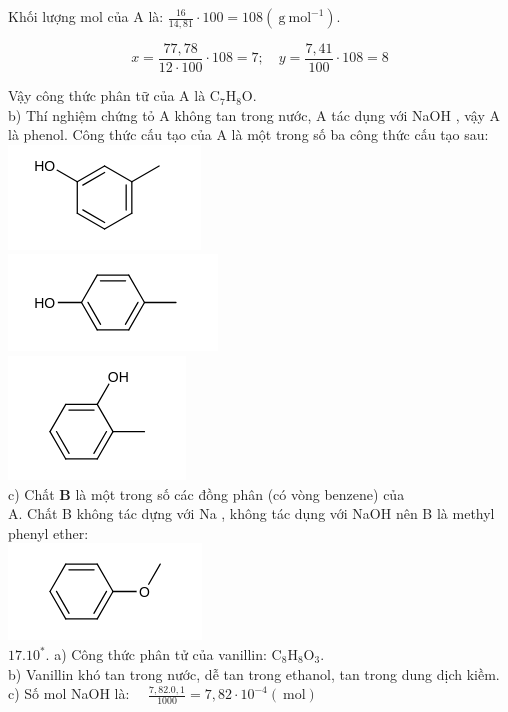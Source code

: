 \documentclass[10pt]{article}
\begin{document}
Khối lượng mol của A là: $\frac{16}{14,81} \cdot 100=108\left(\mathrm{~g} \mathrm{~mol}^{-1}\right)$.

$$
x=\frac{77,78}{12 \cdot 100} \cdot 108=7 ; \quad y=\frac{7,41}{100} \cdot 108=8
$$

Vậy công thức phân tữ của A là $\mathrm{C}_{7} \mathrm{H}_{8} \mathrm{O}$.\\
b) Thí nghiệm chứng tỏ A không tan trong nước, A tác dụng với NaOH , vậy A là phenol. Công thức cấu tạo của A là một trong số ba công thức cấu tạo sau:\\
\includegraphics{smile-d2ed27f42107b6411d7f3ea6b37390536c5e8021}\\
\includegraphics{smile-0f8c0f725ad0cc3e18493b94463c9121d9a4e31b}\\
\includegraphics{smile-c2385a39a7d9cf8c3714f0eee93542a49a97d0ef}\\
c) Chất $\mathbf{B}$ là một trong số các đồng phân (có vòng benzene) của\\
A. Chất B không tác dựng với Na , không tác dụng với NaOH nên B là methyl phenyl ether:\\
\includegraphics{smile-59ee17f34366a7a1401b21c599fe4d6f7f038f33}\\
$17.10^{*}$. a) Công thức phân tử của vanillin: $\mathrm{C}_{8} \mathrm{H}_{8} \mathrm{O}_{3}$.\\
b) Vanillin khó tan trong nước, dễ tan trong ethanol, tan trong dung dịch kiềm.\\
c) Số mol NaOH là: $\quad \frac{7,82.0,1}{1000}=7,82 \cdot 10^{-4}(\mathrm{~mol})$
\end{document}
